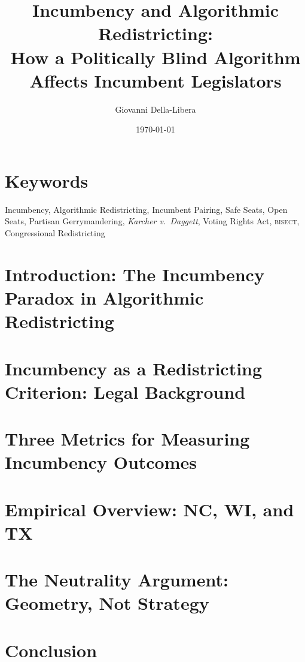 \documentclass[12pt]{article}
\title{\textbf{Incumbency and Algorithmic Redistricting:\\
How a Politically Blind Algorithm Affects Incumbent Legislators}}
\author{Giovanni Della-Libera}
\date{\today}
\begin{document}
\maketitle

\begin{abstract}

\end{abstract}

\section*{Keywords}
Incumbency, Algorithmic Redistricting, Incumbent Pairing, Safe Seats, Open Seats,
Partisan Gerrymandering, \textit{Karcher v.\ Daggett}, Voting Rights Act,
\textsc{bisect}, Congressional Redistricting

\section{Introduction: The Incumbency Paradox in Algorithmic Redistricting}


\section{Incumbency as a Redistricting Criterion: Legal Background}


\section{Three Metrics for Measuring Incumbency Outcomes}


\section{Empirical Overview: NC, WI, and TX}


\section{The Neutrality Argument: Geometry, Not Strategy}


\section{Conclusion}




\end{document}

